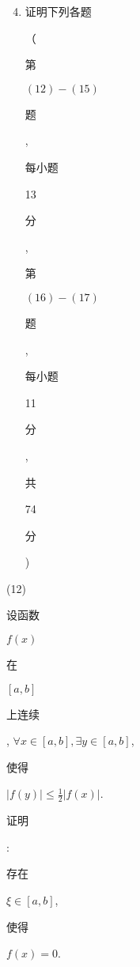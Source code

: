 \documentclass[10pt]{article}
\begin{document}
\begin{enumerate}
  \setcounter{enumi}{3}
  \item \begin{CJK}{UTF8}{mj}证明下列各题\end{CJK}（\begin{CJK}{UTF8}{mj}第\end{CJK} $(12)-(15)$ \begin{CJK}{UTF8}{mj}题\end{CJK}, \begin{CJK}{UTF8}{mj}每小题\end{CJK} 13 \begin{CJK}{UTF8}{mj}分\end{CJK}, \begin{CJK}{UTF8}{mj}第\end{CJK} $(16)-(17)$ \begin{CJK}{UTF8}{mj}题\end{CJK}, \begin{CJK}{UTF8}{mj}每小题\end{CJK} 11 \begin{CJK}{UTF8}{mj}分\end{CJK}, \begin{CJK}{UTF8}{mj}共\end{CJK} 74 \begin{CJK}{UTF8}{mj}分\end{CJK})
\end{enumerate}
(12) \begin{CJK}{UTF8}{mj}设函数\end{CJK} $f(x)$ \begin{CJK}{UTF8}{mj}在\end{CJK} $[a, b]$ \begin{CJK}{UTF8}{mj}上连续\end{CJK}, $\forall x \in[a, b], \exists y \in[a, b]$, \begin{CJK}{UTF8}{mj}使得\end{CJK} $|f(y)| \leq \frac{1}{2}|f(x)|$. \begin{CJK}{UTF8}{mj}证明\end{CJK}: \begin{CJK}{UTF8}{mj}存在\end{CJK} $\xi \in[a, b]$, \begin{CJK}{UTF8}{mj}使得\end{CJK} $f(x)=0$.
\end{document}
